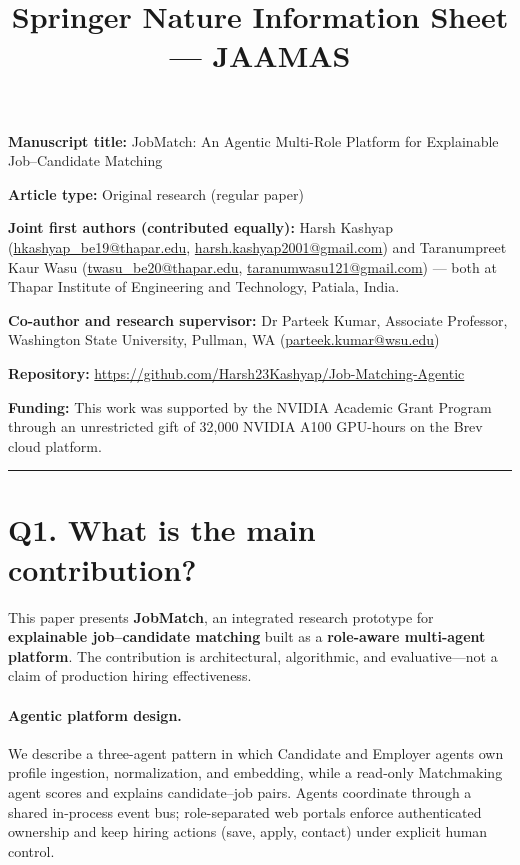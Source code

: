 \documentclass[11pt,a4paper]{article}
\title{Springer Nature Information Sheet --- JAAMAS}
\author{}
\date{}
\begin{document}
\maketitle
\thispagestyle{empty}

\noindent\textbf{Manuscript title:} JobMatch: An Agentic Multi-Role Platform for Explainable Job--Candidate Matching

\noindent\textbf{Article type:} Original research (regular paper)

\noindent\textbf{Joint first authors (contributed equally):} Harsh Kashyap (\url{hkashyap_be19@thapar.edu}, \url{harsh.kashyap2001@gmail.com}) and Taranumpreet Kaur Wasu (\url{twasu_be20@thapar.edu}, \url{taranumwasu121@gmail.com}) --- both at Thapar Institute of Engineering and Technology, Patiala, India.

\noindent\textbf{Co-author and research supervisor:} Dr Parteek Kumar, Associate Professor, Washington State University, Pullman, WA (\url{parteek.kumar@wsu.edu})

\noindent\textbf{Repository:} \url{https://github.com/Harsh23Kashyap/Job-Matching-Agentic}

\noindent\textbf{Funding:} This work was supported by the NVIDIA Academic Grant Program through an unrestricted gift of 32,000 NVIDIA A100 GPU-hours on the Brev cloud platform.

\vspace{0.8em}
\hrule
\vspace{0.8em}

\section*{Q1. What is the main contribution?}

This paper presents \textbf{JobMatch}, an integrated research prototype for \textbf{explainable job--candidate matching} built as a \textbf{role-aware multi-agent platform}. The contribution is architectural, algorithmic, and evaluative---not a claim of production hiring effectiveness.

\paragraph{Agentic platform design.}
We describe a three-agent pattern in which Candidate and Employer agents own profile ingestion, normalization, and embedding, while a read-only Matchmaking agent scores and explains candidate--job pairs. Agents coordinate through a shared in-process event bus; role-separated web portals enforce authenticated ownership and keep hiring actions (save, apply, contact) under explicit human control.
\end{document}
